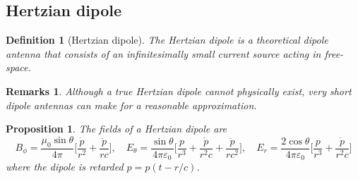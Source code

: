 \documentclass[a4paper]{article}
\newtheorem{remarks}{Remarks}[section]
\theoremstyle{new}
\newtheorem{defi}{Definition}[section]
\newtheorem{prop}{Proposition}[section]
\begin{document}
\subsection{Hertzian dipole}
\begin{defi}[Hertzian dipole]
The Hertzian dipole is a theoretical dipole antenna that consists of an infinitesimally small current source acting in free-space. 
\end{defi}
\begin{remarks}
Although a true Hertzian dipole cannot physically exist, very short dipole antennas can make for a reasonable approximation.
\end{remarks}
\begin{prop}
The fields of a Hertzian dipole are
$$B_\phi=\frac{\mu_0\sin\theta}{4\pi}\bigg[\frac{\dot{p}}{r^2}+\frac{\ddot{p}}{rc}\bigg],\quad E_\theta=\frac{\sin\theta}{4\pi\varepsilon_0}\bigg[\frac{p}{r^3}+\frac{\dot{p}}{r^2c}+\frac{\ddot{p}}{rc^2}\bigg],\quad E_r=\frac{2\cos\theta}{4\pi\varepsilon_0}\bigg[\frac{p}{r^3}+\frac{\dot{p}}{r^2c}\bigg]$$
where the dipole is retarded $p=p(t-r/c)$.
\end{prop}
\end{document}
